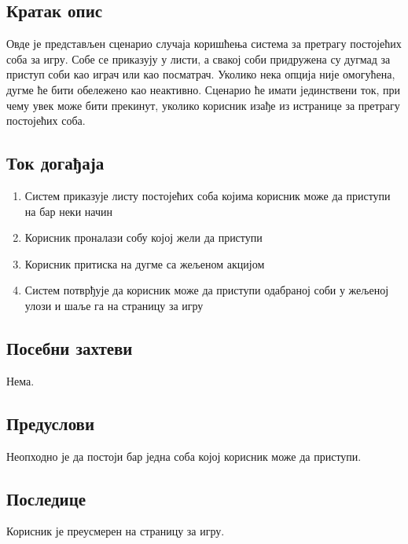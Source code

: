 \subsection{Кратак опис}
Овде је представљен сценарио случаја коришћења система за претрагу постојећих соба за игру.
Собе се приказују у листи, а свакој соби придружена су дугмад за приступ соби као играч или
као посматрач. Уколико нека опција није омогућена, дугме ће бити обележено као неактивно.
Сценарио ће имати јединствени ток, при чему увек може бити прекинут, уколико корисник изађе из
истранице за претрагу постојећих соба.

\subsection{Ток догађаја}
\begin{enumerate}
	\item Систем приказује листу постојећих соба којима корисник може да приступи на бар неки
	      начин
	\item Корисник проналази собу којој жели да приступи
	\item Корисник притиска на дугме са жељеном акцијом
	\item Систем потврђује да корисник може да приступи одабраној соби у жељеној улози
	      и шаље га на страницу за игру
\end{enumerate}

\subsection{Посебни захтеви}
Нема.

\subsection{Предуслови}
Неопходно је да постоји бар једна соба којој корисник може да приступи.

\subsection{Последице}
Корисник је преусмерен на страницу за игру.
